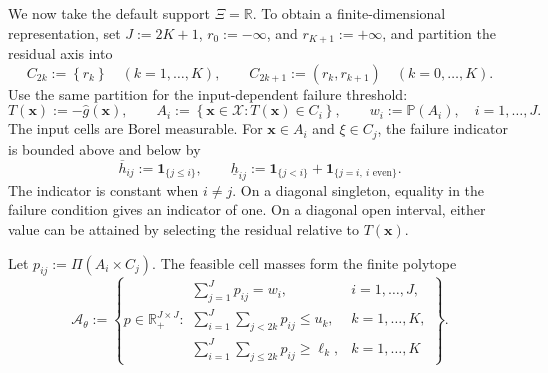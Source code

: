 \documentclass[review,11pt,3p,authoryear,nopreprintline]{elsarticle}
\begin{document}
We now take the default support $\Xi=\mathbb R$. To obtain a finite-dimensional representation, set $J:=2K+1$, $r_0:=-\infty$, and $r_{K+1}:=+\infty$, and partition the residual axis into
\begin{equation}
  C_{2k}:=\left\{r_k\right\}\quad(k=1,\ldots,K),\qquad
  C_{2k+1}:=\left(r_k,r_{k+1}\right)\quad(k=0,\ldots,K).
  \label{eq-residual-cells}
\end{equation}
Use the same partition for the input-dependent failure threshold:
\begin{equation}
  T(\bm x):=-\hat g(\bm x),\qquad
  A_i:=\left\{\bm x\in\mathcal X:T(\bm x)\in C_i\right\},\qquad
  w_i:=\mathbb P\left(A_i\right),\quad i=1,\ldots,J.
  \label{eq-input-cells}
\end{equation}
The input cells are Borel measurable. For $\bm x\in A_i$ and $\xi\in C_j$, the failure indicator is bounded above and below by
\begin{equation}
  \overline h_{ij}:=\mathbf1_{\{j\le i\}},\qquad
  \underline h_{ij}:=\mathbf1_{\{j<i\}}+\mathbf1_{\{j=i,\ i\text{ even}\}}.
  \label{eq-cell-costs}
\end{equation}
The indicator is constant when $i\ne j$. On a diagonal singleton, equality in the failure condition gives an indicator of one. On a diagonal open interval, either value can be attained by selecting the residual relative to $T(\bm x)$.

Let $p_{ij}:=\Pi(A_i\times C_j)$. The feasible cell masses form the finite polytope
\begin{equation}
  \mathcal A_\theta:=
  \left\{p\in\mathbb R_+^{J\times J}:
  \begin{array}{ll}
    \displaystyle\sum_{j=1}^Jp_{ij}=w_i,&i=1,\ldots,J,\\[1mm]
    \displaystyle\sum_{i=1}^J\sum_{j<2k}p_{ij}\le u_k,&k=1,\ldots,K,\\[1mm]
    \displaystyle\sum_{i=1}^J\sum_{j\le2k}p_{ij}\ge\ell_k,&k=1,\ldots,K
  \end{array}\right\}.
  \label{eq-cell-mass-polytope}
\end{equation}
\end{document}
